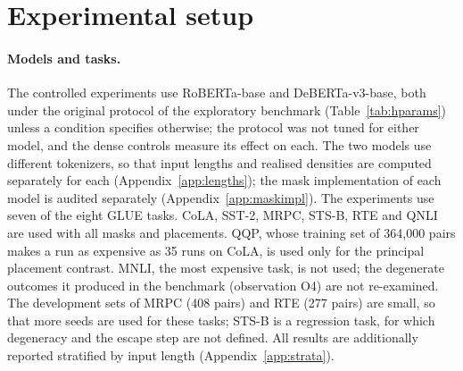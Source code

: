 \documentclass[10pt]{article}
\begin{document}
\section{Experimental setup}
\label{sec:protocol}

\paragraph{Models and tasks.} The controlled experiments use RoBERTa-base and DeBERTa-v3-base, both under the original protocol of the exploratory benchmark (Table~\ref{tab:hparams}) unless a condition specifies otherwise; the protocol was not tuned for either model, and the dense controls measure its effect on each. The two models use different tokenizers, so that input lengths and realised densities are computed separately for each (Appendix~\ref{app:lengths}); the mask implementation of each model is audited separately (Appendix~\ref{app:maskimpl}). The experiments use seven of the eight GLUE tasks. CoLA, SST-2, MRPC, STS-B, RTE and QNLI are used with all masks and placements. QQP, whose training set of 364{,}000 pairs makes a run as expensive as 35 runs on CoLA, is used only for the principal placement contrast. MNLI, the most expensive task, is not used; the degenerate outcomes it produced in the benchmark (observation O4) are not re-examined. The development sets of MRPC (408 pairs) and RTE (277 pairs) are small, so that more seeds are used for these tasks; STS-B is a regression task, for which degeneracy and the escape step are not defined. All results are additionally reported stratified by input length (Appendix~\ref{app:strata}).
\end{document}
